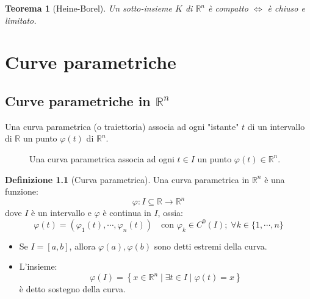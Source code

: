\documentclass[11pt, a4paper, openright]{book}
\theoremstyle{plain}
\newtheorem{teorema}{Teorema}[section]
\theoremstyle{definition}
\newtheorem{definizione}[teorema]{Definizione}
\theoremstyle{remark}
\begin{document}
\begin{teorema}[Heine-Borel]
    Un sotto-insieme $K$ di $\mathbb{R}^n$ è compatto $\iff$ è chiuso e limitato.
\end{teorema}

\chapter{Curve parametriche}
\section{Curve parametriche in $\mathbb{R}^n$}
Una curva parametrica (o traiettoria) associa ad ogni "istante" $t$ di un intervallo di $\mathbb{R}$ un punto $\varphi(t)$ di $\mathbb{R}^n$.
\begin{figure}[H]
    \centering
    \caption{Una curva parametrica associa ad ogni $t \in I$ un punto $\varphi(t) \in \mathbb{R}^n$.}
\end{figure}

\begin{definizione}[Curva parametrica]
    Una curva parametrica in $\mathbb{R}^n$ è una funzione:
    \begin{equation}
        \varphi: I \subseteq \mathbb{R} \longrightarrow \mathbb{R}^n
    \end{equation}
    dove $I$ è un intervallo e $\varphi$ è continua in $I$, ossia:
    \begin{equation}
        \varphi(t) = (\varphi_1(t), \cdots, \varphi_n(t)) \quad \text{con } \varphi_k \in C^0(I); \; \forall k \in \{1, \cdots, n\}
    \end{equation}
    \begin{itemize}
        \item Se $I = [a, b]$, allora $\varphi(a), \varphi(b)$ sono detti estremi della curva.
        \item L'insieme:
        \begin{equation}
            \varphi(I) = \left\{x \in \mathbb{R}^n \mid \exists t \in I \mid \varphi(t) = x\right\}
        \end{equation}
        è detto sostegno della curva.
    \end{itemize}
\end{definizione}
\end{document}
